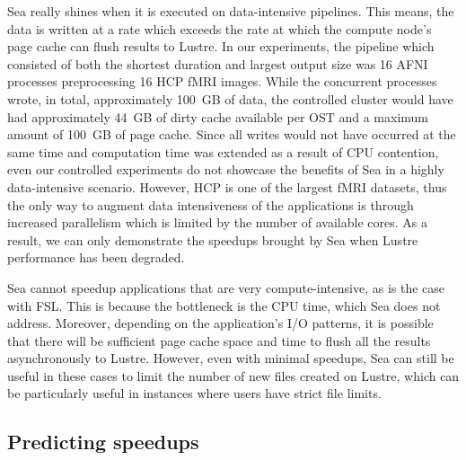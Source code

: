     Sea really shines when it is executed on data-intensive pipelines. This
    means, the data is written at a rate which exceeds the rate at which the
    compute node's page cache can flush results to Lustre. In our experiments,
    the pipeline which consisted of both the shortest duration and largest
    output size was 16 AFNI processes preprocessing 16 HCP fMRI images. While the concurrent processes wrote, in total,
    approximately 100~GB of data, the controlled cluster would have had
    approximately 44~GB of dirty cache available per OST and a maximum amount of
    100~GB of page cache. Since all writes would not have occurred at the same
    time and computation time was extended as a result of CPU contention, even
    our controlled experiments do not showcase the benefits of Sea in a highly
    data-intensive scenario. However, HCP is one of the largest fMRI datasets,
    thus the only way to augment data intensiveness of the applications is
    through increased parallelism which is limited by the number of available
    cores. As a result, we can only demonstrate the speedups brought by Sea when
    Lustre performance has been degraded.


    Sea cannot speedup applications that are very compute-intensive, as is the case with FSL. This is because the bottleneck is the
    CPU time, which Sea does not address. Moreover, depending on the
    application's I/O patterns, it is possible that there will be sufficient
    page cache space and time to flush all the results asynchronously
    to Lustre. However, even with minimal speedups, Sea can still be useful in
    these cases to limit the number of new files created on Lustre, which can be
    particularly useful in instances where users have strict file limits.


    \subsection{Predicting speedups}

